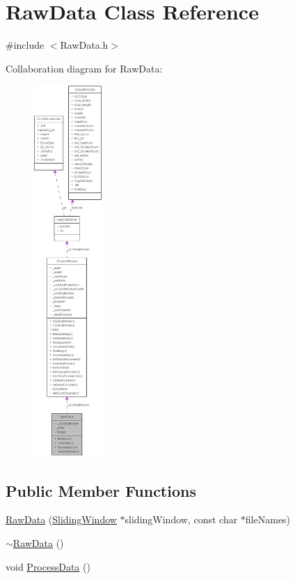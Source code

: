 \hypertarget{class_raw_data}{
\section{RawData Class Reference}
\label{class_raw_data}
}


{\ttfamily \#include $<$RawData.h$>$}



Collaboration diagram for RawData:\nopagebreak
\begin{figure}[H]
\begin{center}
\leavevmode
\includegraphics[height=400pt]{class_raw_data__coll__graph}
\end{center}
\end{figure}
\subsection*{Public Member Functions}
\begin{DoxyCompactItemize}
\item 
\hyperlink{class_raw_data_a9a8f2f3170c5574096ea14611f38aca8}{RawData} (\hyperlink{class_sliding_window}{SlidingWindow} $\ast$slidingWindow, const char $\ast$fileNames)
\item 
\hyperlink{class_raw_data_a214d10a81d07c892cb7b35653772e4e4}{$\sim$RawData} ()
\item 
void \hyperlink{class_raw_data_ac1edea5cb8ba51fd52541b415ba36ec2}{ProcessData} ()
\end{DoxyCompactItemize}


